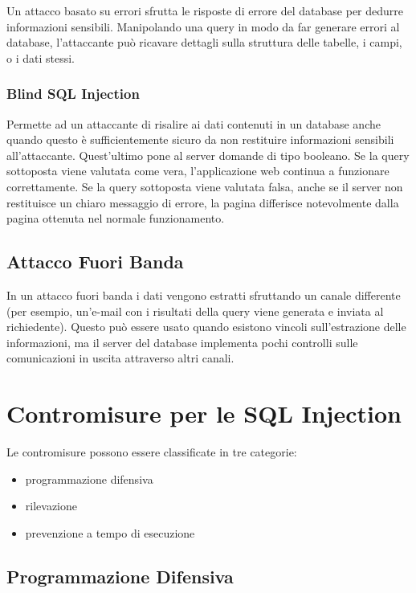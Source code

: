 Un attacco basato su errori sfrutta le risposte di errore del database per dedurre informazioni sensibili. Manipolando una query in modo da far generare errori al database, l'attaccante può ricavare dettagli sulla struttura delle tabelle, i campi, o i dati stessi.

\subsubsection{Blind SQL Injection}

Permette ad un attaccante di risalire ai dati contenuti in un database anche quando questo è sufficientemente sicuro da non restituire informazioni sensibili all'attaccante. Quest'ultimo pone al server domande di tipo booleano. Se la query sottoposta viene valutata come vera, l'applicazione web continua a funzionare correttamente. Se la query sottoposta viene valutata falsa, anche se il server non restituisce un chiaro messaggio di errore, la pagina differisce notevolmente dalla pagina ottenuta nel normale funzionamento.

\subsection{Attacco Fuori Banda}

In un attacco fuori banda i dati vengono estratti sfruttando un canale differente (per esempio, un'e-mail con i risultati della query viene generata e inviata al richiedente). Questo può essere usato quando esistono vincoli sull'estrazione delle informazioni, ma il server del database implementa pochi controlli sulle comunicazioni in uscita attraverso altri canali.

\section{Contromisure per le SQL Injection}

Le contromisure possono essere classificate in tre categorie:

\begin{itemize}
    \item programmazione difensiva
    \item rilevazione
    \item prevenzione a tempo di esecuzione
\end{itemize}

\subsection{Programmazione Difensiva}

